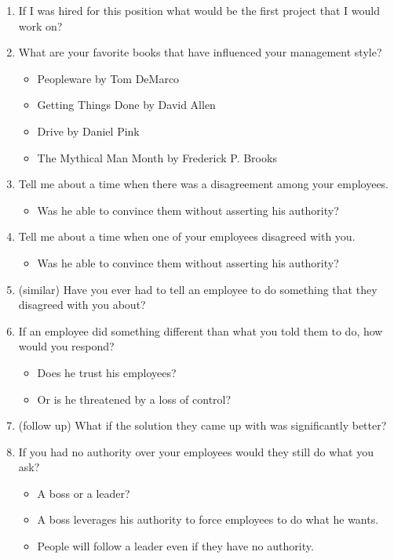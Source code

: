 \documentclass{article}
\begin{document}
\begin{enumerate}

\item If I was hired for this position what would be the first project that
I would work on?

\item What are your favorite books that have influenced your management style?
	\begin{itemize}
	\item Peopleware by Tom DeMarco
	\item Getting Things Done by David Allen
	\item Drive by Daniel Pink
	\item The Mythical Man Month by Frederick P. Brooks
	\end{itemize}

\item Tell me about a time when there was a disagreement among your employees.
	\begin{itemize}
	\item Was he able to convince them without asserting his authority?
	\end{itemize}

\item Tell me about a time when one of your employees disagreed with you.
	\begin{itemize}
	\item Was he able to convince them without asserting his authority?
	\end{itemize}

\item (similar) Have you ever had to tell an employee to do something that
they disagreed with you about?

\item If an employee did something different than what you told them to do,
	how would you respond?
	\begin{itemize}
	\item Does he trust his employees?
	\item Or is he threatened by a loss of control?
	\end{itemize}

\item (follow up) What if the solution they came up with was significantly
	better?

\item If you had no authority over your employees would they still do
	what you ask?
	\begin{itemize}
	\item A boss or a leader?
	\item A boss leverages his authority to force employees to do what he wants.
	\item People will follow a leader even if they have no authority.
	\end{itemize}

\end{enumerate}
\end{document}
